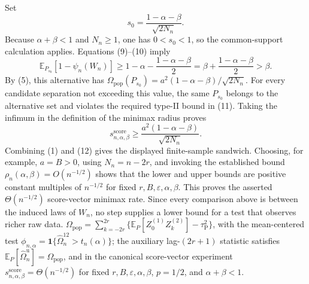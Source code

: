 Set
\[
 s_0=\frac{1-\alpha-\beta}{\sqrt{2N_n}}.
\]
Because \(\alpha+\beta<1\) and \(N_n\ge1\), one has \(0<s_0<1\), so the common-support calculation applies.  Equations (9)--(10) imply
\[
 \mathbb E_{P_{s_0}}[1-\psi_n(W_n)]
 \ge1-\alpha-\frac{1-\alpha-\beta}{2}
 =\beta+\frac{1-\alpha-\beta}{2}>\beta. \tag{11}
\]
By (5), this alternative has
\(\Omega_{\mathrm{pop}}(P_{s_0})=a^2(1-\alpha-\beta)/\sqrt{2N_n}\).
For every candidate separation not exceeding this value, the same \(P_{s_0}\) belongs to the alternative set and violates the required type-II bound in (11).  Taking the infimum in the definition of the minimax radius proves
\[
 s_{n,\alpha,\beta}^{\mathrm{score}}
 \ge\frac{a^2(1-\alpha-\beta)}{\sqrt{2N_n}}. \tag{12}
\]
Combining (1) and (12) gives the displayed finite-sample sandwich.  Choosing, for example, \(a=B>0\), using \(N_n=n-2r\), and invoking the established bound \(\rho_n(\alpha,\beta)=O(n^{-1/2})\) shows that the lower and upper bounds are positive constant multiples of \(n^{-1/2}\) for fixed \(r,B,\varepsilon,\alpha,\beta\).  This proves the asserted \(\Theta(n^{-1/2})\) score-vector minimax rate.  Since every comparison above is between the induced laws of \(W_n\), no step supplies a lower bound for a test that observes richer raw data.
\(\Omega_{\mathrm{pop}}=\sum_{k=-2r}^{2r}\{\mathbb E_P[Z_0^{(1)}Z_k^{(2)}]-\tau_{\mathrm P}^2\}\), with the mean-centered test \(\phi_{n,\alpha}=\mathbf 1\{\widehat\Omega_n^{12}>t_n(\alpha)\}\); the auxiliary lag-\((2r+1)\) statistic satisfies \(\mathbb E_P[\widehat\Omega_n^{\mathrm u}]=\Omega_{\mathrm{pop}}\), and in the canonical score-vector experiment \(s_{n,\alpha,\beta}^{\mathrm{score}}=\Theta(n^{-1/2})\) for fixed \(r,B,\varepsilon,\alpha,\beta\), \(p=1/2\), and \(\alpha+\beta<1\).
